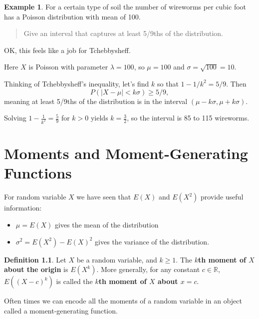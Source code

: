 \documentclass[
]{book}
\providecommand{\tightlist}{%
  \setlength{\itemsep}{0pt}\setlength{\parskip}{0pt}}
\theoremstyle{definition}
\newtheorem{definition}{Definition}[chapter]
\theoremstyle{definition}
\newtheorem{example}{Example}[chapter]
\theoremstyle{definition}
\theoremstyle{definition}
\theoremstyle{remark}
\begin{document}
\begin{example}
\protect\hypertarget{exm:pois-tchebby}{}\label{exm:pois-tchebby}For a certain type of soil the number of wireworms per cubic foot has a Poisson distribution with mean of 100.

\begin{quote}
Give an interval that captures at least 5/9ths of the distribution.
\end{quote}

OK, this feels like a job for Tchebbysheff.

Here \(X\) is Poisson with parameter \(\lambda = 100\), so \(\mu = 100\) and \(\sigma = \sqrt{100} = 10.\)

Thinking of Tchebbysheff's inequality, let's find \(k\) so that \(1 - 1/k^2 = 5/9\). Then \[P(|X-\mu|<k\sigma)\geq 5/9,\] meaning at least 5/9ths of the distribution is in the interval \((\mu - k\sigma,\mu+k\sigma)\).

Solving
\(1 - \frac{1}{k^2} = \frac{5}{9}\) for \(k>0\) yields \(k = \frac{3}{2}\), so the interval is 85 to 115 wireworms.
\end{example}

\chapter{Moments and Moment-Generating Functions}\label{moments-and-moment-generating-functions}

For random variable \(X\) we have seen that \(E(X)\) and \(E(X^2)\) provide useful information:

\begin{itemize}
\tightlist
\item
  \(\mu = E(X)\) gives the mean of the distribution
\item
  \(\sigma^2 = E(X^2) - E(X)^2\) gives the variance of the distribution.
\end{itemize}

\begin{definition}
\protect\hypertarget{def:kth-moment-about-origin}{}\label{def:kth-moment-about-origin}Let \(X\) be a random variable, and \(k \geq 1\). The \textbf{\(k\)th moment of \(X\) about the origin} is \(E(X^k)\). More generally, for any constant \(c \in \mathbb{R}\), \(E((X-c)^k)\) is called the \textbf{\(k\)th moment of \(X\) about \(x = c\)}.
\end{definition}

Often times we can encode all the moments of a random variable in an object called a moment-generating function.
\end{document}
